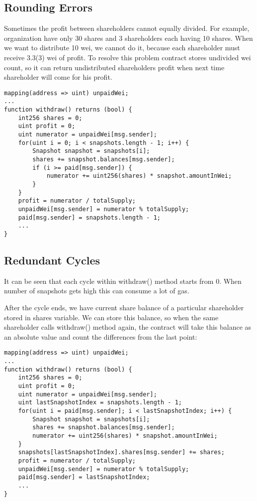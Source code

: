 \documentclass[onecolumn]{article}
\begin{document}
\subsection{Rounding Errors}
Sometimes the profit between shareholders cannot equally divided. For example, organization have only 30 shares and 3 shareholders each having 10 shares. When we want to distribute 10 wei, we cannot do it, because each shareholder must receive 3.3(3) wei of profit. To resolve this problem contract stores undivided wei count, so it can return undistributed shareholders profit when next time shareholder will come for his profit.
\begin{lstlisting}
mapping(address => uint) unpaidWei;
...
function withdraw() returns (bool) {
	int256 shares = 0;
	uint profit = 0;
	uint numerator = unpaidWei[msg.sender];
	for(uint i = 0; i < snapshots.length - 1; i++) {
		Snapshot snapshot = snapshots[i];
		shares += snapshot.balances[msg.sender];
		if (i >= paid[msg.sender]) {
			numerator += uint256(shares) * snapshot.amountInWei;
		}
	}
	profit = numerator / totalSupply;
	unpaidWei[msg.sender] = numerator % totalSupply;
	paid[msg.sender] = snapshots.length - 1;
	...
}
\end{lstlisting}
\subsection{Redundant Cycles}
It can be seen that each cycle within withdraw() method starts from 0. When number of snapshots gets high this can consume a lot of gas.

After the cycle ends, we have current share balance of a particular shareholder stored in shares variable. We can store this balance, so when the same shareholder calls withdraw() method again, the contract will take this balance as an absolute value and count the differences from the last point:
\begin{lstlisting}
mapping(address => uint) unpaidWei;
...
function withdraw() returns (bool) {
	int256 shares = 0;
	uint profit = 0;
	uint numerator = unpaidWei[msg.sender];
	uint lastSnapshotIndex = snapshots.length - 1;
	for(uint i = paid[msg.sender]; i < lastSnapshotIndex; i++) {
		Snapshot snapshot = snapshots[i];
		shares += snapshot.balances[msg.sender];
		numerator += uint256(shares) * snapshot.amountInWei;
	}
	snapshots[lastSnapshotIndex].shares[msg.sender] += shares;
	profit = numerator / totalSupply;
	unpaidWei[msg.sender] = numerator % totalSupply;
	paid[msg.sender] = lastSnapshotIndex;
	...
}
\end{lstlisting}
\end{document}
